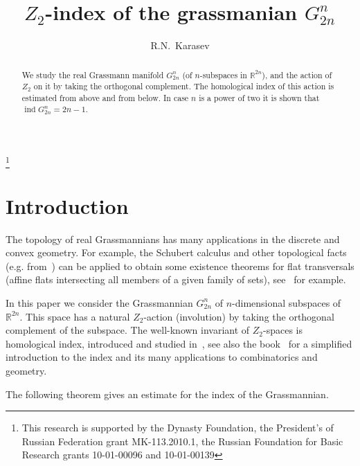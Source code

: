 \documentclass[12pt,a4paper]{amsart}
\theoremstyle{definition}
\theoremstyle{remark}
\begin{document}
\title{$Z_2$-index of the grassmanian $G_{2n}^n$}

\author{R.N.~Karasev}
\thanks{This research is supported by the Dynasty Foundation, the President's of Russian Federation grant MK-113.2010.1, the Russian Foundation for Basic Research grants 10-01-00096 and 10-01-00139}

\address{
Roman Karasev, Dept. of Mathematics, Moscow Institute of Physics
and Technology, Institutskiy per. 9, Dolgoprudny, Russia 141700}



\begin{abstract}
We study the real Grassmann manifold $G_{2n}^n$ (of $n$-subspaces in $\mathbb R^{2n}$), and the action of $Z_2$ on it by taking the orthogonal complement. The homological index of this action is estimated from above and from below. In case $n$ is a power of two it is shown that $\operatorname{ind} G_{2n}^n=2n-1$.
\end{abstract}

\maketitle

\section{Introduction}

The topology of real Grassmannians has many applications in the discrete and convex geometry. For example, the Schubert calculus and other topological facts (e.g. from~\cite{cf1960,hil1980A}) can be applied to obtain some existence theorems for flat transversals (affine flats intersecting all members of a given family of sets), see~\cite{dol1993,ziv2004,kar2008bu,mk2010} for example.

In this paper we consider the Grassmannian $G_{2n}^n$ of $n$-dimensional subspaces of $\mathbb R^{2n}$. This space has a natural $Z_2$-action (involution) by taking the orthogonal complement of the subspace. The well-known invariant of $Z_2$-spaces is homological index, introduced and studied in~\cite{kr1952,schw1957,cf1960}, see also the book~\cite{mat2003} for a simplified introduction to the index and its many applications to combinatorics and geometry.

The following theorem gives an estimate for the index of the Grassmannian.
\end{document}
